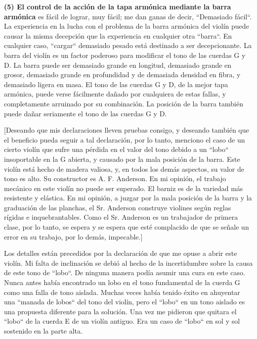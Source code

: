 \documentclass[12pt]{book}
\begin{document}
\textbf{(5) El control de la acción de la tapa armónica mediante la barra armónica} es fácil de lograr, muy fácil; me dan ganas de decir, ``Demasiado fácil``. La experiencia en la lucha con el problema de la barra armónica del violín puede causar la misma decepción que la experiencia en cualquier otra ``barra``. En cualquier caso, ``cargar`` demasiado pesado está destinado a ser decepcionante. La barra del violín es un factor poderoso para modificar el tono de las cuerdas G y D. La barra puede ser demasiado grande en longitud, demasiado grande en grosor, demasiado grande en profundidad y de demasiada densidad en fibra, y demasiado ligera en masa. El tono de las cuerdas G y D, de la mejor tapa armónica, puede verse fácilmente dañado por cualquiera de estas fallas, y completamente arruinado por su combinación. La posición de la barra también puede dañar seriamente el tono de las cuerdas G y D.

[Deseando que mis declaraciones lleven pruebas consigo, y deseando también que el beneficio pueda seguir a tal declaración, por lo tanto, menciono el caso de un cierto violín que sufre una pérdida en el valor del tono debido a un ``lobo`` insoportable en la G abierta, y causado por la mala posición de la barra. Este violín está hecho de madera valiosa, y, en todos los demás aspectos, su valor de tono es alto. Su constructor es A. F. Anderson. En mi opinión, el trabajo mecánico en este violín no puede ser superado. El barniz es de la variedad más resistente y elástica. En mi opinión, a juzgar por la mala posición de la barra y la graduación de las planchas, el Sr. Anderson construye violines según reglas rígidas e inquebrantables. Como el Sr. Anderson es un trabajador de primera clase, por lo tanto, se espera y se espera que esté complacido de que se señale un error en su trabajo, por lo demás, impecable.]

Los detalles están precedidos por la declaración de que me opuse a abrir este violín. Mi falta de inclinación se debió al hecho de la incertidumbre sobre la causa de este tono de ``lobo``. De ninguna manera podía asumir una cura en este caso. Nunca antes había encontrado un lobo en el tono fundamental de la cuerda G como una falla de tono aislada. Muchas veces había tenido éxito en ahuyentar una ``manada de lobos`` del tono del violín, pero el ``lobo`` en un tono aislado es una propuesta diferente para la solución. Una vez me pidieron que quitara el ``lobo`` de la cuerda E de un violín antiguo. Era un caso de ``lobo`` en sol y sol sostenido en la parte alta.
\end{document}
